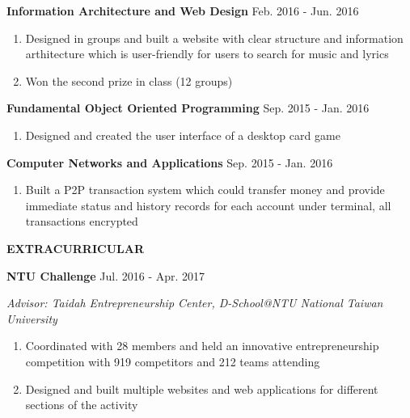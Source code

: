 \documentclass[12pt]{article}
\begin{document}
	\vspace{0.5em}

	\textbf{Information Architecture and Web Design} \hfill{Feb. 2016 - Jun. 2016}

	\begin{enumerate}

		\item Designed in groups and built a website with clear structure and information arthitecture which is user-friendly for users to search for music and lyrics

		\item Won the second prize in class (12 groups)

	\end{enumerate}

	\vspace{0.5em}

	\textbf{Fundamental Object Oriented Programming} \hfill{Sep. 2015 - Jan. 2016}

	\begin{enumerate}

		\item Designed and created the user interface of a desktop card game

	\end{enumerate}

	\vspace{0.5em}

	\textbf{Computer Networks and Applications} \hfill{Sep. 2015 - Jan. 2016}

	\begin{enumerate}

		\item Built a P2P transaction system which could transfer money and provide immediate status and history records for each account under terminal, all transactions encrypted

	\end{enumerate}

	\vspace{1em}

\textbf{\large{\uppercase{Extracurricular}}}
\hrulefill{}

	\textbf{NTU Challenge} \hfill{Jul. 2016 - Apr. 2017}

	\textit{Advisor: Taidah Entrepreneurship Center, D-School@NTU \hfill{National Taiwan University}}

	\begin{enumerate}

		\item Coordinated with 28 members and held an innovative entrepreneurship competition with 919 competitors and 212 teams attending

		\item Designed and built multiple websites and web applications for different sections of the activity

	\end{enumerate}
\end{document}
